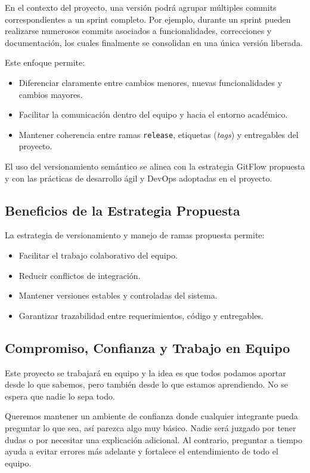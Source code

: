 \documentclass[12pt]{article}
\begin{document}
En el contexto del proyecto, una versión podrá agrupar múltiples commits correspondientes a un sprint completo. Por ejemplo, durante un sprint pueden realizarse numerosos commits asociados a funcionalidades, correcciones y documentación, los cuales finalmente se consolidan en una única versión liberada.

Este enfoque permite:
\begin{itemize}
    \item Diferenciar claramente entre cambios menores, nuevas funcionalidades y cambios mayores.
    \item Facilitar la comunicación dentro del equipo y hacia el entorno académico.
    \item Mantener coherencia entre ramas \texttt{release}, etiquetas (\textit{tags}) y entregables del proyecto.
\end{itemize}

El uso del versionamiento semántico se alinea con la estrategia GitFlow propuesta y con las prácticas de desarrollo ágil y DevOps adoptadas en el proyecto.


\subsection{Beneficios de la Estrategia Propuesta}

La estrategia de versionamiento y manejo de ramas propuesta permite:
\begin{itemize}
    \item Facilitar el trabajo colaborativo del equipo.
    \item Reducir conflictos de integración.
    \item Mantener versiones estables y controladas del sistema.
    \item Garantizar trazabilidad entre requerimientos, código y entregables.
\end{itemize}

\subsection{Compromiso, Confianza y Trabajo en Equipo}

Este proyecto se trabajará en equipo y la idea es que todos podamos aportar desde lo que sabemos, pero también desde lo que estamos aprendiendo. No se espera que nadie lo sepa todo.

Queremos mantener un ambiente de confianza donde cualquier integrante pueda preguntar lo que sea, así parezca algo muy básico. Nadie será juzgado por tener dudas o por necesitar una explicación adicional. Al contrario, preguntar a tiempo ayuda a evitar errores más adelante y fortalece el entendimiento de todo el equipo.
\end{document}
